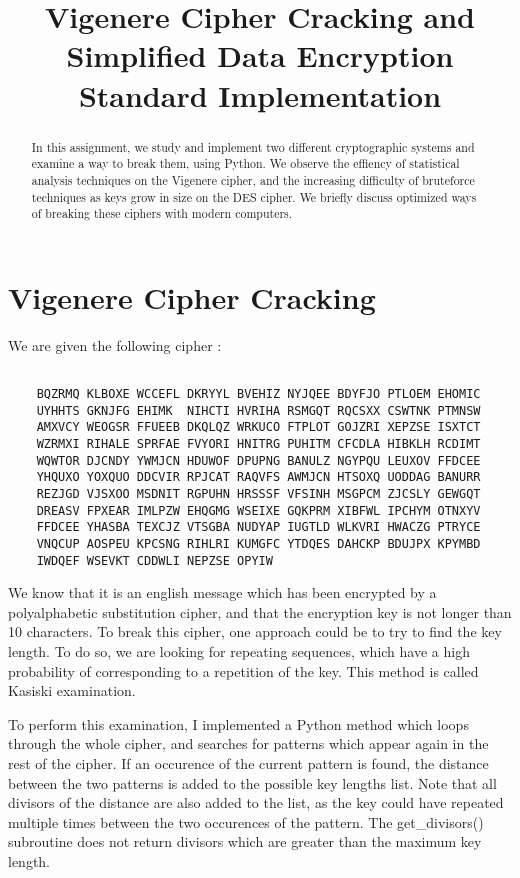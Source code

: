 \documentclass{article}
\title{\textbf{Vigenere Cipher Cracking and Simplified Data Encryption Standard Implementation}}
\author{}
\date{}
\begin{document}
\maketitle \thispagestyle{fancy}

\begin{abstract}
    In this assignment, we study and implement two different cryptographic systems and examine a way to break them, using Python. We observe the effiency of statistical analysis techniques on the Vigenere cipher, and the increasing difficulty of bruteforce techniques as keys grow in size on the DES cipher. We briefly discuss optimized ways of breaking these ciphers with modern computers.
\end{abstract}

\section{Vigenere Cipher Cracking} \label{vignere}

We are given the following cipher :

\begin{verbatim}

    BQZRMQ KLBOXE WCCEFL DKRYYL BVEHIZ NYJQEE BDYFJO PTLOEM EHOMIC
    UYHHTS GKNJFG EHIMK  NIHCTI HVRIHA RSMGQT RQCSXX CSWTNK PTMNSW
    AMXVCY WEOGSR FFUEEB DKQLQZ WRKUCO FTPLOT GOJZRI XEPZSE ISXTCT
    WZRMXI RIHALE SPRFAE FVYORI HNITRG PUHITM CFCDLA HIBKLH RCDIMT
    WQWTOR DJCNDY YWMJCN HDUWOF DPUPNG BANULZ NGYPQU LEUXOV FFDCEE
    YHQUXO YOXQUO DDCVIR RPJCAT RAQVFS AWMJCN HTSOXQ UODDAG BANURR
    REZJGD VJSXOO MSDNIT RGPUHN HRSSSF VFSINH MSGPCM ZJCSLY GEWGQT
    DREASV FPXEAR IMLPZW EHQGMG WSEIXE GQKPRM XIBFWL IPCHYM OTNXYV
    FFDCEE YHASBA TEXCJZ VTSGBA NUDYAP IUGTLD WLKVRI HWACZG PTRYCE
    VNQCUP AOSPEU KPCSNG RIHLRI KUMGFC YTDQES DAHCKP BDUJPX KPYMBD
    IWDQEF WSEVKT CDDWLI NEPZSE OPYIW

\end{verbatim}

We know that it is an english message which has been encrypted by a polyalphabetic substitution cipher, and that the encryption key is not longer than 10 characters. To break this cipher, one approach could be to try to find the key length. To do so, we are looking for repeating sequences, which have a high probability of corresponding to a repetition of the key. This method is called Kasiski examination.\cite{vigenere} \cite{kasiski}

To perform this examination, I implemented a Python method which loops through the whole cipher, and searches for patterns which appear again in the rest of the cipher. If an occurence of the current pattern is found, the distance between the two patterns is added to the possible key lengths list. Note that all divisors of the distance are also added to the list, as the key could have repeated multiple times between the two occurences of the pattern. The get\_divisors() subroutine does not return divisors which are greater than the maximum key length.
\bigskip
\end{document}
